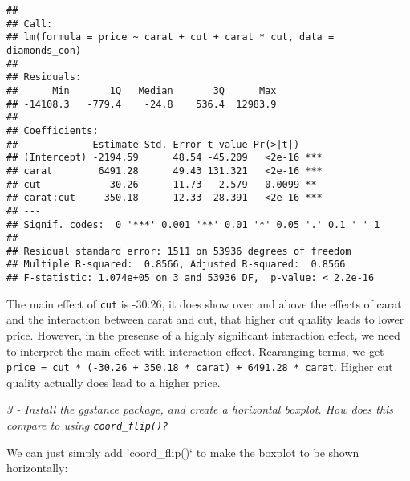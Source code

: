 \documentclass[]{article}
\newenvironment{Shaded}{\begin{snugshade}}{\end{snugshade}}
\newcommand{\KeywordTok}[1]{\textcolor[rgb]{0.13,0.29,0.53}{\textbf{#1}}}
\newcommand{\DataTypeTok}[1]{\textcolor[rgb]{0.13,0.29,0.53}{#1}}
\newcommand{\DecValTok}[1]{\textcolor[rgb]{0.00,0.00,0.81}{#1}}
\newcommand{\StringTok}[1]{\textcolor[rgb]{0.31,0.60,0.02}{#1}}
\newcommand{\OperatorTok}[1]{\textcolor[rgb]{0.81,0.36,0.00}{\textbf{#1}}}
\newcommand{\NormalTok}[1]{#1}
\theoremstyle{definition}
\theoremstyle{definition}
\theoremstyle{definition}
\theoremstyle{remark}
\begin{document}
\begin{verbatim}
## 
## Call:
## lm(formula = price ~ carat + cut + carat * cut, data = diamonds_con)
## 
## Residuals:
##      Min       1Q   Median       3Q      Max 
## -14108.3   -779.4    -24.8    536.4  12983.9 
## 
## Coefficients:
##             Estimate Std. Error t value Pr(>|t|)    
## (Intercept) -2194.59      48.54 -45.209   <2e-16 ***
## carat        6491.28      49.43 131.321   <2e-16 ***
## cut           -30.26      11.73  -2.579   0.0099 ** 
## carat:cut     350.18      12.33  28.391   <2e-16 ***
## ---
## Signif. codes:  0 '***' 0.001 '**' 0.01 '*' 0.05 '.' 0.1 ' ' 1
## 
## Residual standard error: 1511 on 53936 degrees of freedom
## Multiple R-squared:  0.8566, Adjusted R-squared:  0.8566 
## F-statistic: 1.074e+05 on 3 and 53936 DF,  p-value: < 2.2e-16
\end{verbatim}

The main effect of \texttt{cut} is -30.26, it does show over and above
the effects of carat and the interaction between carat and cut, that
higher cut quality leads to lower price. However, in the presense of a
highly significant interaction effect, we need to interpret the main
effect with interaction effect. Rearanging terms, we get
\texttt{price\ =\ cut\ *\ (-30.26\ +\ 350.18\ *\ carat)\ +\ 6491.28\ *\ carat}.
Higher cut quality actually does lead to a higher price.

\emph{3 - Install the ggstance package, and create a horizontal boxplot.
How does this compare to using \texttt{coord\_flip()?}}

We can just simply add 'coord\_flip()` to make the boxplot to be shown
horizontally:

\begin{Shaded}
\end{Shaded}
\end{document}
